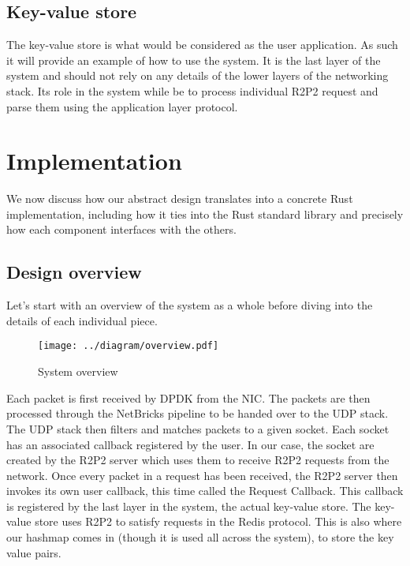\documentclass[11pt]{book}
\newcommand{\marios}[1]{\noindent{{\bf \fbox{MK:} {\textcolor{green}{\it#1}}}}}
\begin{document}
\section{Key-value store}

The key-value store is what would be considered as the user
application. As such it will provide an example of how to use the
system. It is the last layer of the system and should not rely on any
details of the lower layers of the networking stack. Its role in the
system while be to process individual R2P2 request and parse them
using the application layer protocol.

\chapter{Implementation}

We now discuss how our abstract design translates into a concrete Rust
implementation, including how it ties into the Rust standard library
and precisely how each component interfaces with the others.

\section{Design overview}
\marios{This is more or less the graph I told you to include at the beginning of the design section. This should not be part of the implementation.}
Let's start with an overview of the system as a whole before diving
into the details of each individual piece.

\begin{figure}[htb!]
  \texttt{[image: ../diagram/overview.pdf]}
  \caption{System overview}
  \label{fig:design-overview}
\end{figure}

Each packet is first received by DPDK from the NIC\@. The packets are
then processed through the NetBricks \marios{you just introduced NetBricks here. You should do that in the background as an example of a kernel bypassed system that you will later use.} pipeline to be handed over to the
UDP stack. The UDP stack then filters and matches packets to a given
socket. Each socket has an associated callback registered by the
user. In our case, the socket are created by the R2P2 server which
uses them to receive R2P2 requests from the network. Once every packet
in a request has been received, the R2P2 server then invokes its own
user callback, this time called the Request Callback. This callback
is registered by the last layer in the system, the actual key-value
store. The key-value store uses R2P2 to satisfy requests in the Redis
protocol. This is also where our hashmap comes in (though it is used
all across the system), to store the key value pairs.
\end{document}
